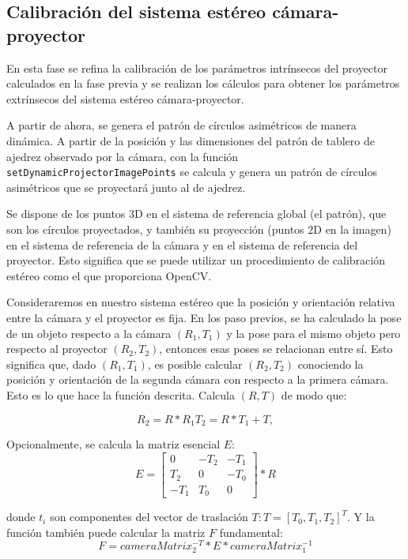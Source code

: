 \subsection{Calibración del sistema estéreo cámara-proyector}
En esta fase se refina la calibración de los parámetros intrínsecos del proyector calculados en la fase previa y se realizan los cálculos para obtener los parámetros extrínsecos del sistema estéreo cámara-proyector.

A partir de ahora, se genera el patrón de círculos asimétricos de manera dinámica. A partir de la posición y las dimensiones del patrón de tablero de ajedrez observado por la cámara, con la función \texttt{setDynamicProjectorImagePoints} se calcula y genera un patrón de círculos asimétricos que se proyectará junto al de ajedrez. 

Se dispone de los puntos 3D en el sistema de referencia global (el patrón), que son los círculos proyectados, y también su proyección (puntos 2D en la imagen) en el sistema de referencia de la cámara y en el sistema de referencia del proyector. Esto significa que se puede utilizar un procedimiento de calibración estéreo como el que proporciona OpenCV. 

Consideraremos en nuestro sistema estéreo que la posición y orientación relativa entre la cámara y el proyector es fija. En los paso previos, se ha  calculado la pose de un objeto respecto a la cámara $(R_1, T_1)$ y la pose para el mismo objeto pero respecto al proyector $(R_2, T_2)$, entonces esas poses se relacionan entre sí. Esto significa que, dado $(R_1,T_1)$, es posible calcular $(R_2,T_2)$ conociendo la posición y orientación de la segunda cámara con respecto a la primera cámara. Esto es lo que hace la función descrita. Calcula $(R,T)$ de modo que:

\begin{equation}
R_2 = R * R_1
T_2 = R * T_1 + T,
\end{equation}

Opcionalmente, se calcula la matriz esencial $E$:
\begin{equation}
E=\begin{bmatrix}
0 & -T_2 & -T_1\\ 
T_2 & 0  & -T_0\\ 
-T_1 & T_0 & 0 
\end{bmatrix} * R
\end{equation}

donde $t_i$ son componentes del vector de traslación $T: T = [T_0, T_1, T_2] ^ T$. Y la función también puede calcular la matriz $F$ fundamental:
\begin{equation}
F = cameraMatrix_2^ {-T} * E * cameraMatrix_1^{-1}
\end{equation}

